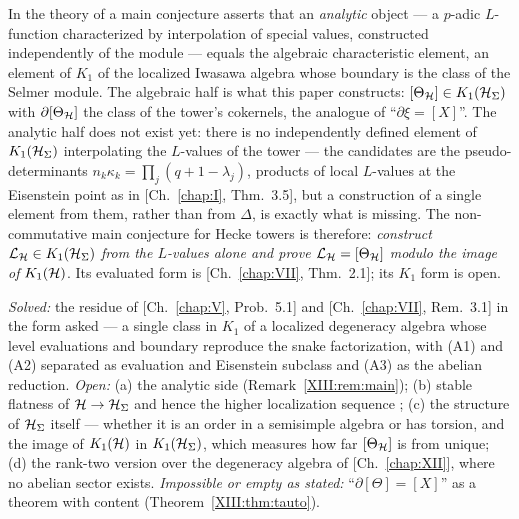 \begin{remark}\label{XIII:rem:main}
In the theory of \cite{CFKSV} a main conjecture asserts that an \emph{analytic} object --- a
$p$-adic $L$-function characterized by interpolation of special values, constructed
independently of the module --- equals the algebraic characteristic element, an element of
$K_1$ of the localized Iwasawa algebra whose boundary is the class of the Selmer module. The
algebraic half is what this paper constructs: $[\Theta_{\mathcal{H}}]\in K_1(\mathcal{H}_\Sigma)$ with
$\partial[\Theta_{\mathcal{H}}]$ the class of the tower's cokernels, the analogue of ``$\partial\xi=[X]$''.
The analytic half does not exist yet: there is no independently defined element of
$K_1(\mathcal{H}_\Sigma)$ interpolating the $L$-values of the tower --- the candidates are the pseudo-determinants
$n_k\kappa_k=\prod_{j}(q{+}1-\lambda_j)$, products of local $L$-values at the Eisenstein point
as in [Ch.~\ref{chap:I}, Thm.~3.5], but a construction of a single element from them, rather than from
$\Delta$, is exactly what is missing. The non-commutative main conjecture for Hecke towers
is therefore: \emph{construct $\mathcal L_{\mathcal{H}}\in K_1(\mathcal{H}_\Sigma)$ from the $L$-values alone and
prove $\mathcal L_{\mathcal{H}}=[\Theta_{\mathcal{H}}]$ modulo the image of $K_1(\mathcal{H})$}. Its evaluated form
is [Ch.~\ref{chap:VII}, Thm.~2.1]; its $K_1$ form is open.
\end{remark}

\begin{remark}\label{XIII:rem:scope}
\emph{Solved:} the residue of [Ch.~\ref{chap:V}, Prob.~5.1] and [Ch.~\ref{chap:VII}, Rem.~3.1] in the form asked --- a single
class in $K_1$ of a localized degeneracy algebra whose level evaluations and boundary
reproduce the snake factorization, with (A1) and (A2) separated as evaluation and Eisenstein
subclass and (A3) as the abelian reduction. \emph{Open:} (a) the analytic side
(Remark~\ref{XIII:rem:main}); (b) stable flatness of $\mathcal{H}\to\mathcal{H}_\Sigma$ and hence the higher localization
sequence \cite{NR}; (c) the structure of $\mathcal{H}_\Sigma$ itself --- whether it is an order in a
semisimple algebra or has torsion, and the image of $K_1(\mathcal{H})$ in $K_1(\mathcal{H}_\Sigma)$, which
measures how far $[\Theta_{\mathcal{H}}]$ is from unique; (d) the rank-two version over the
degeneracy algebra of [Ch.~\ref{chap:XII}], where no abelian sector exists. \emph{Impossible or empty as
stated:} ``$\partial[\Theta]=[X]$'' as a theorem with content (Theorem~\ref{XIII:thm:tauto}).
\end{remark}

